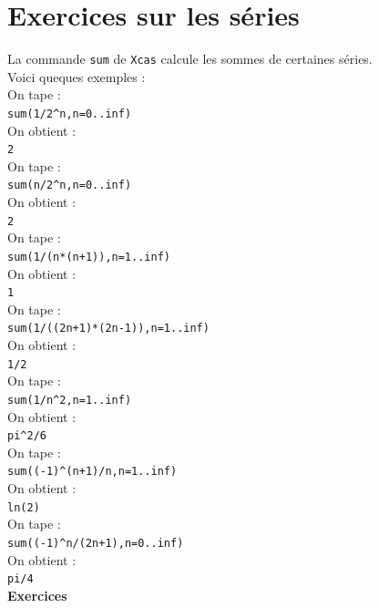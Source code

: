 \documentclass[a4paper,11pt]{book}
\begin{document}
\section{Exercices sur les s\'eries}
La commande {\tt sum} de {\tt Xcas} calcule les sommes de certaines s\'eries.\\
Voici queques exemples :\\
On tape :\\
{\tt sum(1/2\verb|^|n,n=0..inf)}\\
On obtient :\\
{\tt 2}\\
On tape :\\
{\tt sum(n/2\verb|^|n,n=0..inf)}\\
On obtient :\\
{\tt 2}\\
On tape :\\
{\tt  sum(1/(n*(n+1)),n=1..inf)}\\
On obtient :\\
{\tt 1}\\
On tape :\\
{\tt sum(1/((2n+1)*(2n-1)),n=1..inf)}\\
On obtient :\\
{\tt 1/2}\\
On tape :\\
{\tt sum(1/n\verb|^|2,n=1..inf)}\\
On obtient :\\
{\tt pi\verb|^|2/6}\\
On tape :\\
{\tt sum((-1)\verb|^|(n+1)/n,n=1..inf)}\\
On obtient :\\
{\tt ln(2)}\\
On tape :\\
{\tt sum((-1)\verb|^|n/(2n+1),n=0..inf)}\\
On obtient :\\
{\tt pi/4}\\
{\bf Exercices}
\end{document}
